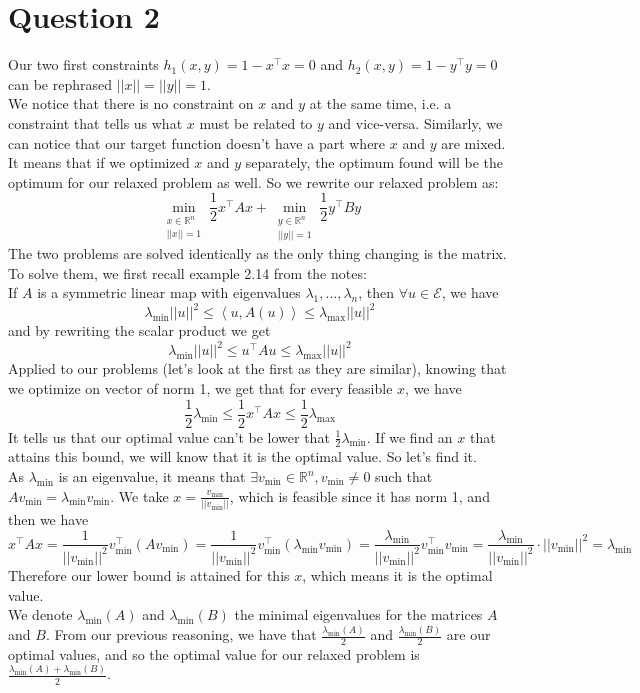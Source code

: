 \documentclass{article}
\newcommand{\R}{\mathbb{R}}
\newcommand{\tp}{^\top}
\begin{document}
\section*{Question 2}

Our two first constraints $h_1(x,y)=1-x\tp x =0$ and $h_2(x,y)=1-y\tp y =0$ can be rephrased $||x||=||y||=1$.\\
We notice that there is no constraint on $x$ and $y$ at the same time, i.e. a constraint that tells us what $x$ must be related to $y$ and vice-versa. Similarly, we can notice that our target function doesn't have a part where $x$ and $y$ are mixed.\\
It means that if we optimized $x$ and $y$ separately, the optimum found will be the optimum for our relaxed problem as well. So we rewrite our relaxed problem as:
$$\min_{\substack{x\in \R^n\\ ||x||=1}}  \frac{1}{2} x\tp A x +\min_{\substack{y \in \R^n\\ ||y||=1}} \frac{1}{2} y\tp B y$$
The two problems are solved identically as the only thing changing is the matrix. To solve them, we first recall example 2.14 from the notes:\\
If $A$ is a symmetric linear map with eigenvalues $\lambda_1, ...,\lambda_n$, then $\forall u \in \mathcal{E}$, we have $$\lambda_{\min} ||u||^2 \leq \left< u, A(u)\right>\leq \lambda_{\max}||u||^2$$
and by rewriting the scalar product we get 
$$\lambda_{\min} ||u||^2 \leq u\tp A u \leq \lambda_{\max} ||u||^2$$
Applied to our problems (let's look at the first as they are similar), knowing that we optimize on vector of norm 1, we get that for every feasible $x$, we have
$$\frac{1}{2}\lambda_{\min}  \leq\frac{1}{2} x\tp A x \leq\frac{1}{2} \lambda_{\max} $$
It tells us that our optimal value can't be lower that $\frac{1}{2} \lambda_{\min}$. If we find an $x$ that attains this bound, we will know that it is the optimal value. So let's find it.\\
As $\lambda_{\min}$ is an eigenvalue, it means that $\exists v_{\min} \in \R^n, v_{\min} \neq 0$ such that $A v_{\min}=\lambda_{\min} v_{\min}$. We take $x=\frac{v_{\min}}{||v_{\min}||}$, which is feasible since it has norm 1, and then we have
$$x\tp A x =\frac{1}{||v_{\min}||^2} v_{\min}\tp \left( A v_{\min} \right)=\frac{1}{||v_{\min}||^2} v_{\min}\tp (\lambda_{\min} v_{\min})=\frac{\lambda_{\min}}{||v_{\min}||^2} v_{\min}\tp v_{\min}=\frac{\lambda_{\min}}{||v_{\min}||^2} \cdot ||v_{\min}||^2=\lambda_{\min}$$
Therefore our lower bound is attained for this $x$, which means it is the optimal value.\\
We denote $\lambda_{\min} (A)$ and $\lambda_{\min} (B)$ the minimal eigenvalues for the matrices $A$ and $B$. From our previous reasoning, we have that $\frac{\lambda_{\min} (A)}{2}$ and $\frac{\lambda_{\min} (B)}{2}$ are our optimal values, and so the optimal value for our relaxed problem is $\frac{\lambda_{\min} (A)+\lambda_{\min} (B)}{2}$.\\
\end{document}
